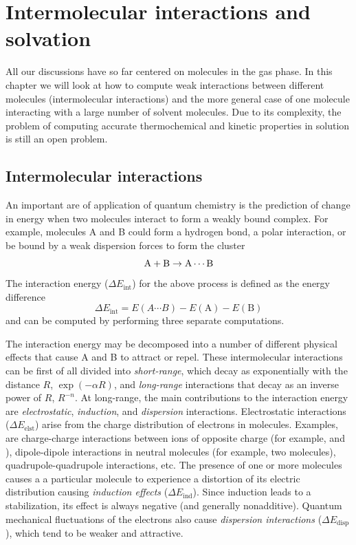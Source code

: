 \documentclass[../Main/notes.tex]{subfiles}
\begin{document}
\chapter{Intermolecular interactions and solvation}

All our discussions have so far centered on molecules in the gas phase.
In this chapter we will look at how to compute weak interactions between different molecules (intermolecular interactions) and the more general case of one molecule interacting with a large number of solvent molecules.
Due to its complexity, the problem of computing accurate thermochemical and kinetic properties in solution is still an open problem.

\section{Intermolecular interactions}

An important are of application of quantum chemistry is the prediction of change in energy when two molecules interact to form a weakly bound complex.
For example, molecules A and B could form a hydrogen bond, a polar interaction, or be bound by a weak dispersion forces to form the cluster 
\begin{equation}
\ce{A + B} \rightarrow \ce{A\cdots B}
\end{equation}
The interaction energy ($\Delta E_\text{int}$) for the above process is defined as the energy difference
\begin{equation}
\Delta E_\text{int} = E(A\cdots B) - E(\text{A}) - E(\text{B})
\end{equation}
and can be computed by performing three separate computations.

The interaction energy may be decomposed into a number of different physical effects that cause A and B to attract or repel.
These intermolecular interactions can be first of all divided into \emph{short-range}, which decay as exponentially with the distance $R$, $\exp(-\alpha R)$, and \emph{long-range} interactions that decay as an inverse power of $R$, $R^{-n}$.
At long-range, the main contributions to the interaction energy are \emph{electrostatic}, \emph{induction}, and \emph{dispersion} interactions.
Electrostatic interactions ($\Delta E_\text{elst}$) arise from the charge distribution of electrons in molecules.
Examples, are charge-charge interactions between ions of opposite charge (for example,  and ), dipole-dipole interactions in neutral molecules (for example, two  molecules), quadrupole-quadrupole interactions, etc.
The presence of one or more molecules causes a a particular molecule to experience a distortion of its electric distribution causing \emph{induction effects} ($\Delta E_\text{ind}$). Since induction leads to a stabilization, its effect is always negative (and generally nonadditive).
Quantum mechanical fluctuations of the electrons also cause \emph{dispersion interactions} ($\Delta E_\text{disp}$), which tend to be weaker and attractive.
\end{document}

